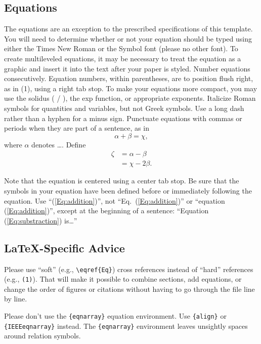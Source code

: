 \documentclass[a4paper, 10pt, conference]{ieeeconf}      %
\begin{document}
\subsection{Equations}

The equations are an exception to the prescribed specifications of this template. You will need to determine whether or not your equation should be typed using either the Times New Roman or the Symbol font (please no other font). To create multileveled equations, it may be necessary to treat the equation as a graphic and insert it into the text after your paper is styled. Number equations consecutively. Equation numbers, within parentheses, are to position flush right, as in (1), using a right tab stop. To make your equations more compact, you may use the solidus ( / ), the exp function, or appropriate exponents. Italicize Roman symbols for quantities and variables, but not Greek symbols. Use a long dash rather than a hyphen for a minus sign. Punctuate equations with commas or periods when they are part of a sentence, as in
\begin{equation}
\alpha + \beta = \chi, \label{Eq:addition}
\end{equation}
where $\alpha$ denotes \ldots. Define 
\begin{align}
\zeta &= \alpha - \beta  \nonumber \\ 
			&= \chi - 2\beta.  \label{Eq:substraction}
\end{align}

Note that the equation is centered using a center tab stop. Be sure that the symbols in your equation have been defined before or immediately following the equation. Use ``(\ref{Eq:addition})'', not ``Eq.~(\ref{Eq:addition})'' or ``equation (\ref{Eq:addition})'', except at the beginning of a sentence: ``Equation (\ref{Eq:substraction}) is\ldots''


\subsection{\LaTeX-Specific Advice}

Please use ``soft'' (e.g., \verb|\eqref{Eq}|) cross references instead
of ``hard'' references (e.g., \verb|(1)|). That will make it possible
to combine sections, add equations, or change the order of figures or
citations without having to go through the file line by line.

Please don't use the \verb|{eqnarray}| equation environment. Use
\verb|{align}| or \verb|{IEEEeqnarray}| instead. The \verb|{eqnarray}|
environment leaves unsightly spaces around relation symbols.
\end{document}
